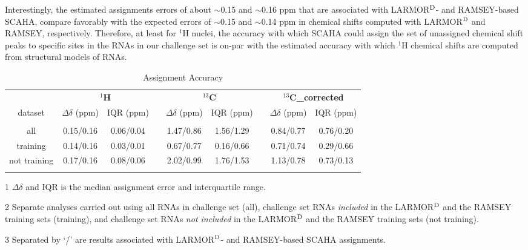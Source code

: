 \documentclass[journal=jcisd8,manuscript=article,layout=onecolumn]{achemso}
\begin{document}
Interestingly, the estimated assignments errors of about $\sim$0.15 and $\sim$0.16 ppm that are associated with LARMOR$^{\rm D}$- and RAMSEY-based SCAHA, compare favorably with the expected errors of $\sim$0.15\cite{frank2014simple} and $\sim$0.14 ppm\cite{frank2013prediction} in chemical shifts computed with LARMOR$^{\rm D}$ and RAMSEY, respectively. Therefore, at least for $^{1}$H nuclei, the accuracy with which SCAHA could assign the set of unassigned chemical shift peaks  to specific sites in the RNAs in our challenge set is on-par with the estimated accuracy with which $^{1}$H chemical shifts are computed from structural models of RNAs.
\begin{table}[h!]
\centering
\caption{Assignment Accuracy}
\begin{threeparttable}
\begin{tabular}{c c c c c c c c c}
\toprule
{} &  \multicolumn{2}{c}{\textbf{$^{1}$H}} & {} & \multicolumn{2}{c}{\textbf{$^{13}$C}} & {} & \multicolumn{2}{c}{\textbf{$^{13}$C_{\rm corrected}}} \\   
dataset & $\Delta \delta$ (ppm) & IQR (ppm)  & {} & $\Delta \delta$ (ppm) & IQR (ppm) & {} & $\Delta \delta$ (ppm) & IQR (ppm)   \\
\hline
\\
all & 0.15/0.16 & 0.06/0.04 & {} & 1.47/0.86 & 1.56/1.29 & {} & 0.84/0.77 & 0.76/0.20 \\
training & 0.14/0.16 & 0.03/0.01 & {} & 0.67/0.77 & 0.16/0.66 & {} & 0.71/0.74 & 0.29/0.66 \\
not training & 0.17/0.16 & 0.08/0.06 & {} & 2.02/0.99 & 1.76/1.53 & {} & 1.13/0.78 & 0.73/0.13 \\
\\
\hline
\end{tabular}
\begin{tablenotes}
\item[1] $\Delta\delta$ and IQR is the median assignment error and interquartile range.
\item[2] Separate analyses carried out using all RNAs in challenge set (all), challenge set RNAs \textit{included} in the LARMOR$^{\rm D}$ and the RAMSEY training sets (training), and challenge set RNAs \textit{not included} in the LARMOR$^{\rm D}$ and the RAMSEY training sets (not training).
\item[3] Separated by `/' are  results associated with LARMOR$^{\rm D}$- and RAMSEY-based SCAHA assignments.

\end{tablenotes}
\end{threeparttable}
\label{tab:accuracy} 
\end{table}
\end{document}
